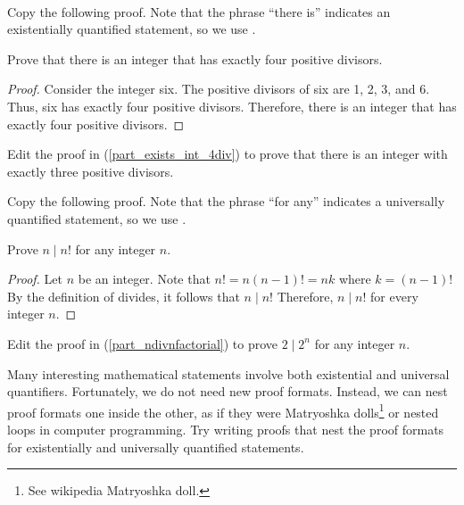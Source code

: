 \begin{act}
\label{act_proof_quants}  
~
    \begin{actpart}
        \item \label{part_exists_int_4div} Copy the following proof. Note that the phrase ``there is'' indicates an existentially quantified statement, so we use .

        Prove that there is an integer that has exactly four positive divisors.  
            \begin{proof}
                Consider the integer six.  The positive divisors of six are 1, 2, 3, and 6.  Thus, six has exactly four positive divisors. Therefore, there is an integer that has exactly four positive divisors.
            \end{proof}
        
        \item Edit the proof in (\ref{part_exists_int_4div}) to prove that there is an integer with exactly three positive divisors.
        \item \label{part_ndivnfactorial} Copy the following proof. Note that the phrase ``for any'' indicates a universally quantified statement, so we use .

        Prove $n \mid n!$ for any integer $n$. 
            \begin{proof}
                Let $n$ be an integer.  Note that $n!=n(n-1)!=nk$ where $k=(n-1)!$  By the definition of divides, it follows that $n \mid n!$ Therefore, $n \mid n!$ for every integer $n$.
            \end{proof}
        \item Edit the proof in (\ref{part_ndivnfactorial}) to prove $2 \mid 2^n$ for any integer $n$.
    \end{actpart}
\end{act}

Many interesting mathematical statements involve both existential and universal quantifiers.  Fortunately, we do not need new proof formats.  Instead, we can nest proof formats one inside the other, as if they were Matryoshka dolls\footnote{See wikipedia Matryoshka doll.} or nested loops in computer programming.  Try writing proofs that nest the proof formats for existentially and universally quantified statements.

